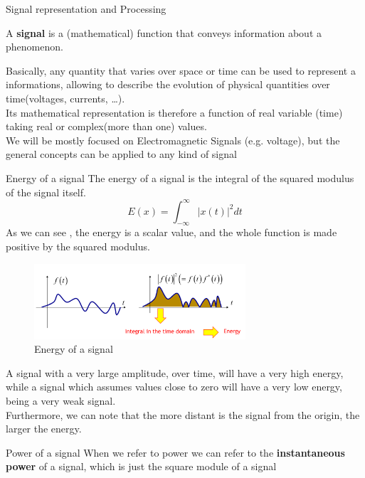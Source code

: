 \begin{section}{Signal representation and Processing}
  \begin{boxH}
    A \textbf{signal} is a (mathematical) function that conveys information about a phenomenon.
  \end{boxH}
  Basically, any quantity that varies over space or time can be used to represent a informations,
  allowing to describe the evolution of physical quantities over time(voltages, currents, \dots).\\
  Its mathematical representation is therefore a function of real variable (time) taking real or 
  complex(more than one) values.\\
  We will be mostly focused on Electromagnetic Signals (e.g. voltage), but the general concepts 
  can be applied to any kind of signal
  \begin{subsection}{Energy of a signal}
    The energy of a signal is the integral of the squared modulus of the signal itself.
    \begin{equation}
      E(x) = \int_{-\infty}^{\infty} |x(t)|^2 dt
    \end{equation}
    As we can see , the energy is a scalar value, and the whole function is made positive by the
    squared modulus.\\
    \begin{figure}[h]
      \centering
      \includegraphics[width=0.7\textwidth]{img/wireless/energy signal.png}
      \caption{Energy of a signal}
      \label{fig:Energy of a signal}
    \end{figure}
    A signal with a very large amplitude, over time, will have a very high energy, while a signal
    which assumes values close to zero will have a very low energy, being a very weak signal.\\
    Furthermore, we can note that the more distant is the signal from the origin, the larger the energy.
  \end{subsection}
  \begin{subsection}{Power of a signal}
    When we refer to power we can refer to the \textbf{instantaneous power} of a signal, which is just the 
    square module of a signal

\end{subsection}
\end{section}
